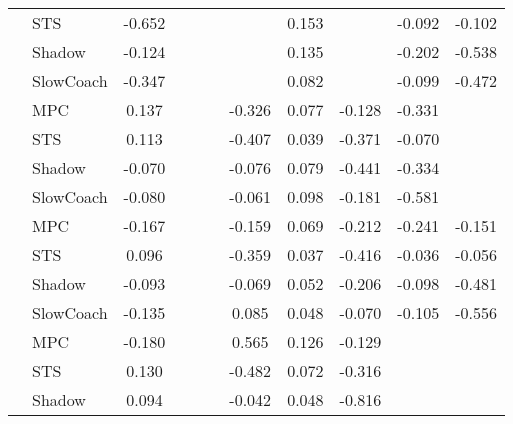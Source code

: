 \begin{tabular}{|l|l|*{9}{c|}}
                                                           & STS &   -0.652 &        &        &     &     &  0.153 &      &  -0.092 &   -0.102 \\
                                                           & Shadow &   -0.124 &        &        &     &     &  0.135 &      &  -0.202 &   -0.538 \\
                                                           & SlowCoach &   -0.347 &        &        &     &     &  0.082 &      &  -0.099 &   -0.472 \\
\midrule
[True, False, False, False, True, True, True, True, False] & MPC &    0.137 &        &        &     & -0.326 &  0.077 &  -0.128 &  -0.331 &       \\
                                                           & STS &    0.113 &        &        &     & -0.407 &  0.039 &  -0.371 &  -0.070 &       \\
                                                           & Shadow &   -0.070 &        &        &     & -0.076 &  0.079 &  -0.441 &  -0.334 &       \\
                                                           & SlowCoach &   -0.080 &        &        &     & -0.061 &  0.098 &  -0.181 &  -0.581 &       \\
\midrule
[True, False, False, False, True, True, True, True, True] & MPC &   -0.167 &        &        &     & -0.159 &  0.069 &  -0.212 &  -0.241 &   -0.151 \\
                                                           & STS &    0.096 &        &        &     & -0.359 &  0.037 &  -0.416 &  -0.036 &   -0.056 \\
                                                           & Shadow &   -0.093 &        &        &     & -0.069 &  0.052 &  -0.206 &  -0.098 &   -0.481 \\
                                                           & SlowCoach &   -0.135 &        &        &     &  0.085 &  0.048 &  -0.070 &  -0.105 &   -0.556 \\
\midrule
[True, False, False, False, True, True, True, False, False] & MPC &   -0.180 &        &        &     &  0.565 &  0.126 &  -0.129 &      &       \\
                                                           & STS &    0.130 &        &        &     & -0.482 &  0.072 &  -0.316 &      &       \\
                                                           & Shadow &    0.094 &        &        &     & -0.042 &  0.048 &  -0.816 &      &       \\

\end{tabular}

